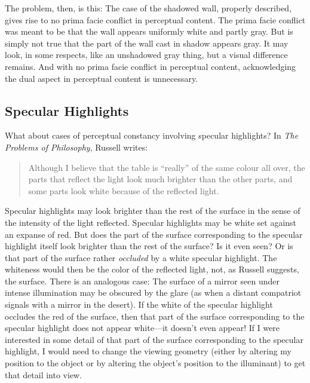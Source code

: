 \documentclass[12pt]{article}
\begin{document}
The problem, then, is this: The case of the shadowed wall, properly described, gives rise to no prima facie conflict in perceptual content. The prima facie conflict was meant to be that the wall appears uniformly white and partly gray. But is simply not true that the part of the wall cast in shadow appears gray. It may look, in some respects, like an unshadowed gray thing, but a visual difference remains. And with no prima facie conflict in perceptual content, acknowledging the dual aspect in perceptual content is unnecessary.


\subsection{Specular Highlights} %
\label{sub:specular_highlights}

What about cases of perceptual constancy involving specular highlights? In \emph{The Problems of Philosophy}, Russell writes:
	\begin{quote}
		Although I believe that the table is ``really'' of the same colour all over, the parts that reflect the light look much brighter than the other parts, and some parts look white because of the reflected light. \citep[2]{Russell:1912uq}
	\end{quote}
Specular highlights may look brighter than the rest of the surface in the sense of the intensity of the light reflected. Specular highlights may be white set against an expanse of red. But does the part of the surface corresponding to the specular highlight itself look brighter than the rest of the surface? Is it even seen? Or is that part of the surface rather \emph{occluded} by a white specular highlight. The whiteness would then be the color of the reflected light, not, as Russell suggests, the surface. There is an analogous case: The surface of a mirror seen under intense illumination may be obscured by the glare (as when a distant compatriot signals with a mirror in the desert). If the white of the specular highlight occludes the red of the surface, then that part of the surface corresponding to the specular highlight does not appear white---it doesn't even appear! If I were interested in some detail of that part of the surface corresponding to the specular highlight, I would need to change the viewing geometry (either by altering my position to the object or by altering the object's position to the illuminant) to get that detail into view.
\end{document}
